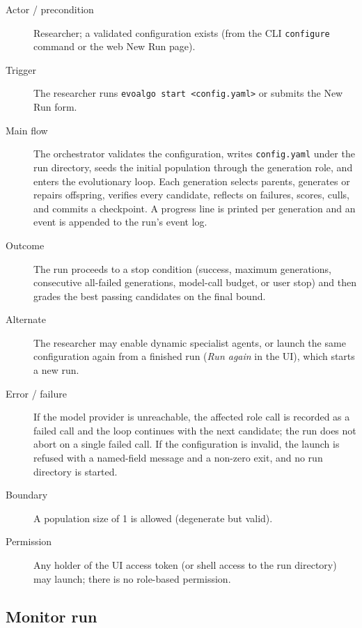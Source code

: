 \begin{description}
  \item[Actor / precondition] Researcher; a validated configuration exists
  (from the CLI \texttt{configure} command or the web New Run page).
  \item[Trigger] The researcher runs \texttt{evoalgo start <config.yaml>} or
  submits the New Run form.
  \item[Main flow] The orchestrator validates the configuration, writes
  \texttt{config.yaml} under the run directory, seeds the initial population
  through the generation role, and enters the evolutionary loop. Each
  generation selects parents, generates or repairs offspring, verifies every
  candidate, reflects on failures, scores, culls, and commits a checkpoint. A
  progress line is printed per generation and an event is appended to the run's
  event log.
  \item[Outcome] The run proceeds to a stop condition (success, maximum
  generations, consecutive all-failed generations, model-call budget, or user
  stop) and then grades the best passing candidates on the final bound.
  \item[Alternate] The researcher may enable dynamic specialist agents, or
  launch the same configuration again from a finished run (\emph{Run again} in
  the UI), which starts a new run.
  \item[Error / failure] If the model provider is unreachable, the affected
  role call is recorded as a failed call and the loop continues with the next
  candidate; the run does not abort on a single failed call. If the
  configuration is invalid, the launch is refused with a named-field message
  and a non-zero exit, and no run directory is started.
  \item[Boundary] A population size of 1 is allowed (degenerate but valid).
  \item[Permission] Any holder of the UI access token (or shell access to the
  run directory) may launch; there is no role-based permission.
\end{description}

\subsection{Monitor run}

